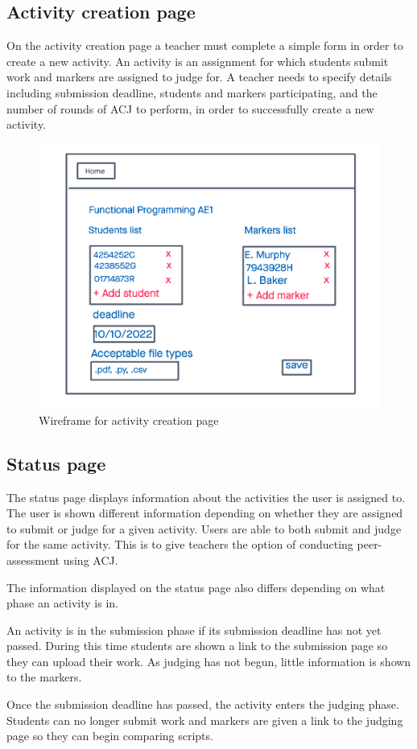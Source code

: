 \documentclass{l4proj}
\begin{document}
\subsection{Activity creation page}
On the activity creation page a teacher must complete a simple form in order to create a new activity. An activity is an assignment for which students submit work and markers are assigned to judge for. A teacher needs to specify details including submission deadline, students and markers participating, and the number of rounds of ACJ to perform, in order to successfully create a new activity.

\begin{figure}[h]
\begin{center}
    \includegraphics[width=0.45\linewidth]{images/w-create-assignment.png}    
    \caption{Wireframe for activity creation page}
\end{center}
\end{figure}

\subsection{Status page}
The status page displays information about the activities the user is assigned to. The user is shown different information depending on whether they are assigned to submit or judge for a given activity. Users are able to both submit and judge for the same activity. This is to give teachers the option of conducting peer-assessment using ACJ.

The information displayed on the status page also differs depending on what phase an activity is in.

An activity is in the submission phase if its submission deadline has not yet passed. During this time students are shown a link to the submission page so they can upload their work. As judging has not begun, little information is shown to the markers.

Once the submission deadline has passed, the activity enters the judging phase. Students can no longer submit work and markers are given a link to the judging page so they can begin comparing scripts.
\end{document}
